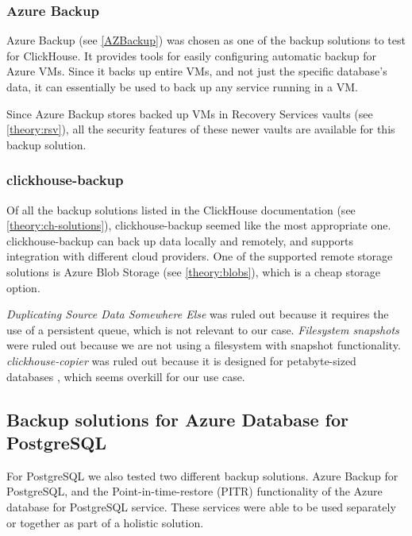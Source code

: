 \subsubsection{Azure Backup} 

Azure Backup (see \ref{AZBackup}) was chosen as one of the backup solutions to test for ClickHouse. It provides tools for easily configuring automatic backup for Azure VMs. Since it backs up entire VMs, and not just the specific database's data, it can essentially be used to back up any service running in a VM.

Since Azure Backup stores backed up VMs in Recovery Services vaults (see \ref{theory:rsv}), all the security features of these newer vaults are available for this backup solution.

\subsubsection{clickhouse-backup}

Of all the backup solutions listed in the ClickHouse documentation (see \ref{theory:ch-solutions}), clickhouse-backup seemed like the most appropriate one. clickhouse-backup can back up data locally and remotely, and supports integration with different cloud providers. 
One of the supported remote storage solutions is Azure Blob Storage (see \ref{theory:blobs}), which is a cheap storage option.

\textit{Duplicating Source Data Somewhere Else} was ruled out because it requires the use of a persistent queue, which is not relevant to our case. \textit{Filesystem snapshots} were ruled out because we are not using a filesystem with snapshot functionality. \textit{clickhouse-copier} was ruled out because it is designed for petabyte-sized databases \cite{noauthor_data_nodate}, which seems overkill for our use case.

\subsection{Backup solutions for Azure Database for PostgreSQL}
For PostgreSQL we also tested two different backup solutions. Azure Backup for PostgreSQL, and the Point-in-time-restore (PITR) functionality of the Azure database for PostgreSQL service. These services were able to be used separately or together as part of a holistic solution.


